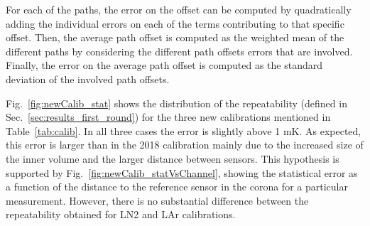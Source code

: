For each of the paths, the error on the offset can be computed by quadratically adding the individual errors on each of the terms contributing to that specific offset. Then, the average path offset is computed as the weighted mean of the different paths by considering the different path offsets errors that are involved. Finally, the error on the average path offset is computed as the standard deviation of the involved path offsets.

Fig.~\ref{fig:newCalib_stat} shows the distribution of the repeatability (defined in Sec.~\ref{sec:results_first_round}) for the three new calibrations mentioned in Table~\ref{tab:calib}. In all three cases the error is slightly above 1 mK. As expected, this error is larger than in the 2018 calibration mainly due to the increased size of the inner volume and the larger distance between sensors. This hypothesis is supported by Fig.~\ref{fig:newCalib_statVsChannel}, showing the statistical error as a function of the distance to the reference sensor in the corona for a particular measurement. However, there is no substantial difference between the repeatability obtained for LN2 and LAr calibrations.



